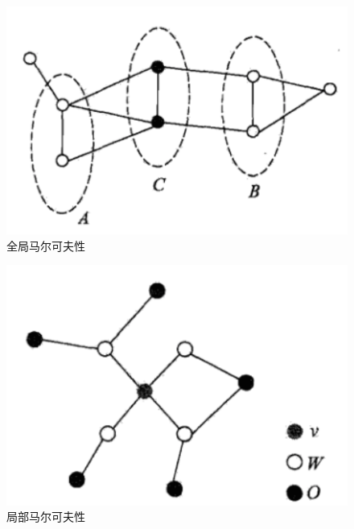 \begin{frame}

	\begin{figure}[htbp]
		\centering
		\includegraphics[scale=0.6]{pic/1-1.png}
		\caption{全局马尔可夫性}
		\label{1-001}
	\end{figure}

\end{frame}

\begin{frame}

	\begin{figure}[htbp]
		\centering
		\includegraphics[scale=0.6]{pic/1-2.png}
		\caption{局部马尔可夫性}
		\label{1-002}
	\end{figure}

\end{frame}


